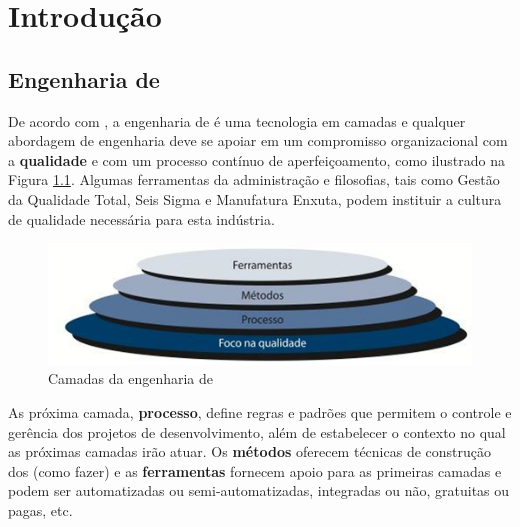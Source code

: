 
\chapter{Introdução}

\section{Engenharia de \sw}

De acordo com \cite{pressman}, a engenharia de \sw é uma tecnologia em camadas e qualquer abordagem de engenharia deve se apoiar em um compromisso organizacional com a \textbf{qualidade} e com um processo contínuo de aperfeiçoamento, como ilustrado na Figura \ref{fig:sw.camadas}. Algumas ferramentas da administração e filosofias, tais como Gestão da Qualidade Total\footnotemark {}, Seis Sigma\footnotemark {} e Manufatura Enxuta\footnotemark, podem instituir a cultura de qualidade necessária para esta indústria.


\begin{figure}[!h]
\centering
\includegraphics[scale=1]{figuras/eng_sw_camadas.png}
\caption{Camadas da engenharia de \sw \citep[p.17]{pressman}}
\label{fig:sw.camadas}
\end{figure}

As próxima camada, \textbf{processo}, define regras e padrões que permitem o controle e gerência dos projetos de desenvolvimento, além de estabelecer o contexto no qual as próximas camadas irão atuar. Os \textbf{métodos} oferecem técnicas de construção dos \sws (como fazer) e as \textbf{ferramentas} fornecem apoio para as primeiras camadas e podem ser automatizadas ou semi-automatizadas, integradas ou não, gratuitas ou pagas, etc.

